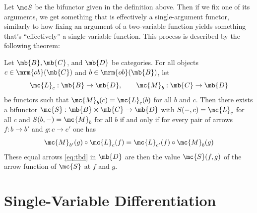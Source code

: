 \documentclass{fkbook}
\newcommand{\ob}{\mrm{ob}}
\begin{document}
\begin{adjustwidth}{1em}{1em}
  Let $\mc S$ be the bifunctor given in the definition above. Then if
  we fix one of its arguments, we get something that is effectively a
  single-argument functor, similarly to how fixing an argument of a
  two-variable function yields something that's ``effectively'' a
  single-variable function. This process is described by the following
  theorem:
  \begin{theorem}
    Let $\mb{B}, \mb{C}$, and $\mb{D}$ be categories. For all objects
    $c \in \ob(\mb{C})$ and $b \in \ob(\mb{B})$, let
    \[
      \mc{L}_{c} : \mb{B} \to \mb{D}, \qquad \mc{M}_b : \mb{C} \to
      \mb{D}
    \]
    be functors such that $\mc{M}_b(c) = \mc{L}_c(b)$ for all $b$ and
    $c$. Then there exists a bifunctor $\mc{S} : \mb{B} \times \mb{C}
    \to \mb{D}$ with $S(-, c) = \mc{L}_c$ for all $c$ and $S(b, -) =
    \mc{M}_b$ for all $b$ if and only if for every pair of arrows $f :
    b \to b'$ and $g : c \to c'$ one has
    \begin{equation}
      \mc{M}_{b'}(g) \circ \mc{L}_c(f) = \mc{L}_{c'}(f) \circ
      \mc{M}_b(g) \label{eq:tbd}
    \end{equation}
    These equal arrows \ref{eq:tbd} in $\mb{D}$ are then the value
    $\mc{S}(f,g)$ of the arrow function of $\mc{S}$ at $f$ and $g$.
  \end{theorem}

\end{adjustwidth}



\chapter{Single-Variable Differentiation}
\end{document}
